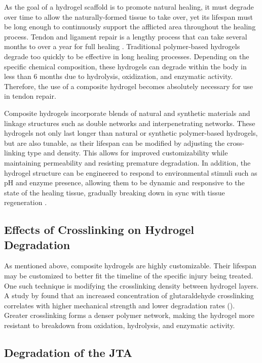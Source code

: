 As the goal of a hydrogel scaffold is to promote natural healing, it must degrade over time to
allow the naturally-formed tissue to take over, yet its lifespan must be long enough to
continuously support the afflicted area throughout the healing process. Tendon and ligament
repair is a lengthy process that can take several months to over a year for full healing \autocite{RN1}. Traditional polymer-based hydrogels degrade too quickly to be effective in long healing
processes. Depending on the specific chemical composition, these hydrogels can degrade
within the body in less than 6 months due to hydrolysis, oxidization, and enzymatic activity.
Therefore, the use of a composite hydrogel becomes absolutely necessary for use in
tendon repair.

Composite hydrogels incorporate blends of natural and synthetic materials and linkage
structures such as double networks and interpenetrating networks. These hydrogels not only
last longer than natural or synthetic polymer-based hydrogels, but are also tunable, as their
lifespan can be modified by adjusting the cross-linking type and density. This allows for
improved customizability while maintaining permeability and resisting premature degradation. In
addition, the hydrogel structure can be engineered to respond to environmental stimuli such as
pH and enzyme presence, allowing them to be dynamic and responsive to the state of the
healing tissue, gradually breaking down in sync with tissue regeneration \autocite{RN3}.

\subsection{Effects of Crosslinking on Hydrogel Degradation
}

As mentioned above, composite hydrogels are highly customizable. Their lifespan may be
customized to better fit the timeline of the specific injury being treated. One such technique is
modifying the crosslinking density between hydrogel layers. A study by \citeauthor{RN4} found that an
increased concentration of glutaraldehyde crosslinking correlates with higher mechanical
strength and lower degradation rates (\citeyear{RN4}). Greater crosslinking forms a denser polymer network,
making the hydrogel more resistant to breakdown from oxidation, hydrolysis, and enzymatic
activity.

\subsection{Degradation of the JTA}

